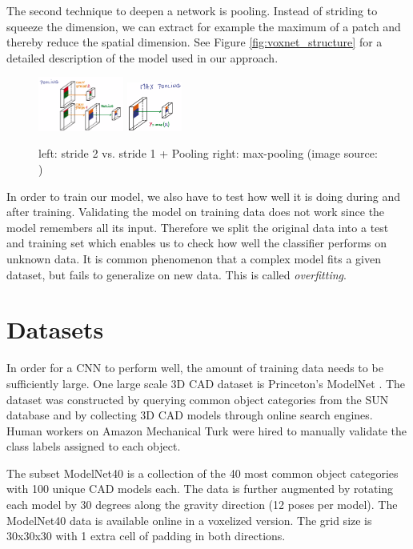 \documentclass[10pt,twocolumn,letterpaper]{article}
\begin{document}
The second technique to deepen a network is pooling. Instead of striding to squeeze the dimension, 
we can extract for example the maximum of a patch and thereby reduce the spatial dimension. 
See Figure \ref{fig:voxnet_structure} for a detailed description of the model used in our approach.

\begin{figure}[h]
	\includegraphics[width=0.25\textwidth]{figures/con_max}
	\includegraphics[width=0.16\textwidth]{figures/max}
	\caption{left: stride 2 vs. stride 1 + Pooling \quad right: max-pooling (image source: \cite{udacity})}
	\label{fig:pooling}
\end{figure}

In order to train our model, we also have to test how well it is doing during and after training. 
Validating the model on training data does not work since the model remembers all its input. 
Therefore we split the original data into a test and training set which enables us to check how well the 
classifier performs on unknown data. It is common phenomenon that a complex model fits a given 
dataset, but fails to generalize on new data. This is called \textit{overfitting}.

\section{Datasets}
\label{data:modelnet}

In order for a CNN to perform well, the amount of training data needs to be sufficiently large. One large scale 3D CAD dataset is Princeton's 
ModelNet \cite{shape}. The dataset was constructed by querying common object categories from the SUN database \cite{sun} and 
by collecting 3D CAD models through online search engines. Human workers on Amazon Mechanical Turk were hired 
to manually validate the class labels assigned to each object.

The subset ModelNet40 is a collection of the 40 most common object categories with 100 unique CAD models each. The data is further augmented
by rotating each model by 30 degrees along the gravity direction (12 poses per model). 
The ModelNet40 data is available online in a voxelized version. The grid size is 30x30x30 with 1 extra cell of padding in both directions.
\end{document}
